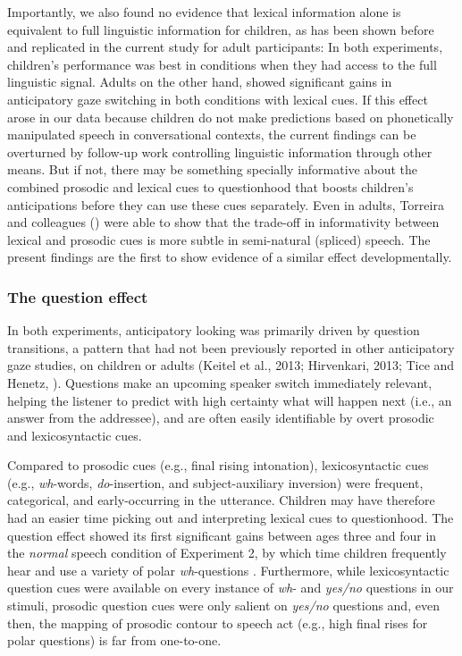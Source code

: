\documentclass[authoryear, 12pt]{elsarticle}
\begin{document}
Importantly, we also found no evidence that lexical information alone is equivalent to full linguistic information for children, as has been shown before \cite{magyari2012, de-ruiter2006} and replicated in the current study for adult participants: In both experiments, children's performance was best in conditions when they had access to the full linguistic signal. Adults on the other hand, showed significant gains in anticipatory gaze switching in both conditions with lexical cues. If this effect arose in our data because children do not make predictions based on phonetically manipulated speech in conversational contexts, the current findings can be overturned by follow-up work controlling linguistic information through other means. But if not, there may be something specially informative about the combined prosodic and lexical cues to questionhood that boosts children's anticipations before they can use these cues separately. Even in adults, Torreira and colleagues (\citeyear{torreira2015}) were able to show that the trade-off in informativity between lexical and prosodic cues is more subtle in semi-natural (spliced) speech. The present findings are the first to show evidence of a similar effect developmentally.

\subsubsection{The question effect}

In both experiments, anticipatory looking was primarily driven by question transitions, a pattern that had not been previously reported in other anticipatory gaze studies, on children or adults (Keitel et al., 2013; Hirvenkari, 2013; Tice and Henetz, \citeyear{TiceHenetz11}). Questions make an upcoming speaker switch immediately relevant, helping the listener to predict with high certainty what will happen next (i.e., an answer from the addressee), and are often easily identifiable by overt prosodic and lexicosyntactic cues.

Compared to prosodic cues (e.g., final rising intonation), lexicosyntactic cues (e.g., \textit{wh}-words, \textit{do}-insertion, and subject-auxiliary inversion) were frequent, categorical, and early-occurring in the utterance. Children may have therefore had an easier time picking out and interpreting lexical cues to questionhood. The question effect showed its first significant gains between ages three and four in the \textit{normal} speech condition of Experiment 2, by which time children frequently hear and use a variety of polar \textit{wh}-questions \citep{clark2009}. Furthermore, while lexicosyntactic question cues were available on every instance of \textit{wh}- and \textit{yes/no} questions in our stimuli, prosodic question cues were only salient on \textit{yes/no} questions and, even then, the mapping of prosodic contour to speech act (e.g., high final rises for polar questions) is far from one-to-one.
\end{document}
